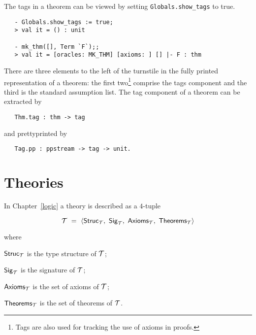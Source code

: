 The tags in a theorem can be viewed by setting \verb+Globals.show_tags+ to
true.

\setcounter{sessioncount}{1}
\begin{session}
\begin{verbatim}
   - Globals.show_tags := true;
   > val it = () : unit

   - mk_thm([], Term `F`);;
   > val it = [oracles: MK_THM] [axioms: ] [] |- F : thm
\end{verbatim}
\end{session}

There are three elements to the left of the turnstile in the fully printed
representation of a theorem: the first two\footnote{Tags are also used for
tracking the use of axioms in proofs.} comprise the tags component and the
third is the standard assumption list. The tag component of a theorem
can be extracted by

\begin{boxed}
\begin{verbatim}
   Thm.tag : thm -> tag
\end{verbatim}
\end{boxed}

\noindent and prettyprinted by

\begin{boxed}
\begin{verbatim}
   Tag.pp : ppstream -> tag -> unit.
\end{verbatim}
\end{boxed}


\section{Theories}
\label{theoryfns}

In Chapter~\ref{logic} a theory is described as a $4$-tuple

\[ {\cal T}\ =\ \langle{\sf Struc}_{\cal T},\
                {\sf Sig}_{\cal T},\
                {\sf Axioms}_{\cal T},\
                {\sf Theorems}_{\cal T}\rangle \]

\noindent where
\begin{myenumerate}
\item ${\sf Struc}_{\cal T}$ is
the type structure of ${\cal T}$;
\item ${\sf Sig}_{\cal T}$ is
the signature of ${\cal T}$;
\item ${\sf Axioms}_{\cal T}$ is
the set of axioms of ${\cal T}$;
\item ${\sf Theorems}_{\cal T}$ is the set of
theorems of ${\cal T}$.
\end{myenumerate}

